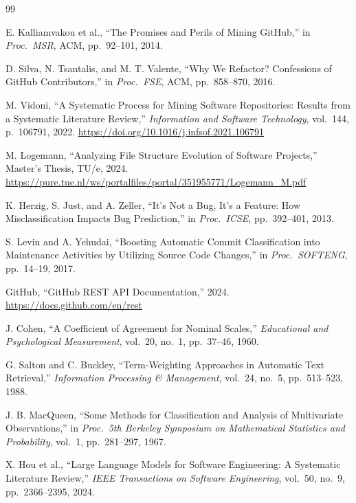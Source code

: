 \documentclass{article}
\begin{document}
\begin{thebibliography}{99}

E. Kalliamvakou et al.,
``The Promises and Perils of Mining GitHub,''
in \textit{Proc.\ MSR}, ACM, pp.~92--101, 2014.

D. Silva, N. Tsantalis, and M. T. Valente,
``Why We Refactor? Confessions of GitHub Contributors,''
in \textit{Proc.\ FSE}, ACM, pp.~858--870, 2016.

M. Vidoni,
``A Systematic Process for Mining Software Repositories: Results from a
Systematic Literature Review,''
\textit{Information and Software Technology}, vol.~144, p.~106791, 2022.
\url{https://doi.org/10.1016/j.infsof.2021.106791}

M. Logemann,
``Analyzing File Structure Evolution of Software Projects,''
Master's Thesis, TU/e, 2024.
\url{https://pure.tue.nl/ws/portalfiles/portal/351955771/Logemann_M.pdf}

K. Herzig, S. Just, and A. Zeller,
``It's Not a Bug, It's a Feature: How Misclassification Impacts Bug Prediction,''
in \textit{Proc.\ ICSE}, pp.~392--401, 2013.

S. Levin and A. Yehudai,
``Boosting Automatic Commit Classification into Maintenance Activities
by Utilizing Source Code Changes,''
in \textit{Proc.\ SOFTENG}, pp.~14--19, 2017.

GitHub,
``GitHub REST API Documentation,''
2024.
\url{https://docs.github.com/en/rest}


J. Cohen,
``A Coefficient of Agreement for Nominal Scales,''
\textit{Educational and Psychological Measurement}, vol.~20, no.~1,
pp.~37--46, 1960.

G. Salton and C. Buckley,
``Term-Weighting Approaches in Automatic Text Retrieval,''
\textit{Information Processing \& Management}, vol.~24, no.~5,
pp.~513--523, 1988.

J. B. MacQueen,
``Some Methods for Classification and Analysis of Multivariate Observations,''
in \textit{Proc.\ 5th Berkeley Symposium on Mathematical Statistics and
Probability}, vol.~1, pp.~281--297, 1967.

X. Hou et al.,
``Large Language Models for Software Engineering: A Systematic Literature Review,''
\textit{IEEE Transactions on Software Engineering}, vol.~50, no.~9,
pp.~2366--2395, 2024.


\end{thebibliography}
\end{document}
